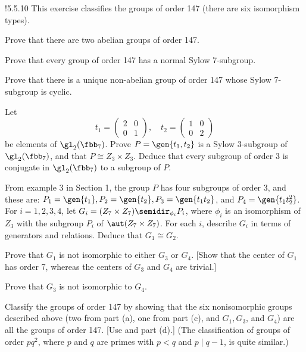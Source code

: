 \begin{exercise}!{5.5.10}
    This exercise classifies the groups of order 147 (there are six isomorphism types).
    \begin{subexercises}
        \item Prove that there are two abelian groups of order 147.
        \item Prove that every group of order 147 has a normal Sylow 7-subgroup.
        \item Prove that there is a unique non-abelian group of order 147 whose Sylow 7-subgroup is cyclic.
        \item Let
        \[
        	t_1 = 
            \begin{pmatrix}
                2 & 0 \\
                0 & 1
            \end{pmatrix}, \quad
            t_2 = 
            \begin{pmatrix}
                1 & 0 \\
                0 & 2
            \end{pmatrix}
        \]
        be elements of $\gl_2(\fbb_7)$.
	    Prove $P = \gen{t_1, t_2}$ is a Sylow 3-subgroup of $\gl_2(\fbb_7)$, and that $P \cong Z_3 \times Z_3$.
	    Deduce that every subgroup of order 3 is conjugate in $\gl_2(\fbb_7)$ to a subgroup of $P$.
        \item From example 3 in Section 1, the group $P$ has four subgroups of order 3, and these are: $P_1 = \gen{t_1}, P_2 = \gen{t_2}, P_3 = \gen{t_1t_2}$, and $P_4 = \gen{t_1t_2^2}$.
	    For $i = 1, 2, 3, 4$, let $G_i = (Z_7 \times Z_7) \semidir_{\phi_i} P_i$, where $\phi_i$ is an isomorphism of $Z_3$ with the subgroup $P_i$ of $\aut(Z_7 \times Z_7)$.
	    For each $i$, describe $G_i$ in terms of generators and relations.
	    Deduce that $G_1 \cong G_2$.
        \item Prove that $G_1$ is not isomorphic to either $G_3$ or $G_4$. [Show that the center of $G_1$ has order 7, whereas the centers of $G_3$ and $G_4$ are trivial.]
        \item Prove that $G_3$ is not isomorphic to $G_4$.
        \item Classify the groups of order 147 by showing that the six nonisomorphic groups described above (two from part (a), one from part (c), and $G_1, G_3$, and $G_4$) are all the groups of order 147. [Use  and part (d).] (The classification of groups of order $pq^2$, where $p$ and $q$ are primes with $p < q$ and $p \mid q - 1$, is quite similar.)
    \end{subexercises}
\end{exercise}

